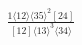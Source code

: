 \documentclass[varwidth, border=5pt]{standalone}
\begin{document}
\begin{my}
$\begin{gathered}
\scriptscriptstyle\frac{1⟨12⟩⟨35⟩^2[24]}{[12]⟨13⟩^3⟨34⟩}
\end{gathered}$
\end{my}
\end{document}
